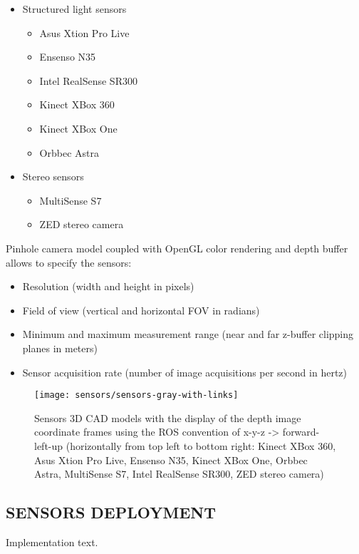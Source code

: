 \begin{itemize}
	\item Structured light sensors
	\begin{itemize}
		\item Asus Xtion Pro Live
		\item Ensenso N35
		\item Intel RealSense SR300
		\item Kinect XBox 360
		\item Kinect XBox One
		\item Orbbec Astra
	\end{itemize}
	\item Stereo sensors
	\begin{itemize}
		\item MultiSense S7
		\item ZED stereo camera
	\end{itemize}
\end{itemize}
Pinhole camera model coupled with OpenGL color rendering and depth buffer allows to specify the sensors:
\begin{itemize}
	\item Resolution (width and height in pixels)
	\item Field of view (vertical and horizontal FOV in radians)
	\item Minimum and maximum measurement range (near and far z-buffer clipping planes in meters)
	\item Sensor acquisition rate (number of image acquisitions per second in hertz)
\end{itemize}

\begin{figure}
	\centering
	\texttt{[image: sensors/sensors-gray-with-links]}
	\caption{Sensors 3D CAD models with the display of the depth image coordinate frames using the ROS convention of x-y-z -> forward-left-up (horizontally from top left to bottom right: Kinect XBox 360, Asus Xtion Pro Live, Ensenso N35, Kinect XBox One, Orbbec Astra, MultiSense S7, Intel RealSense SR300, ZED stereo camera)}
\end{figure}


\subsection{\uppercase{Sensors deployment}}\label{subsec:sensors-deployment}

Implementation text.

